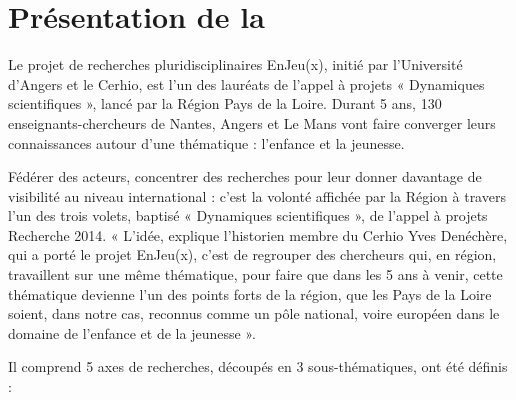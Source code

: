 \section{Présentation de la \pe\ }

Le projet de recherches pluridisciplinaires EnJeu(x), initié par l'Université d'Angers et le Cerhio, est l'un des lauréats de l'appel à projets « Dynamiques scientifiques », lancé par la Région Pays de la Loire. Durant 5 ans, 130 enseignants-chercheurs de Nantes, Angers et Le Mans vont faire converger leurs connaissances autour d'une thématique : l'enfance et la jeunesse.

Fédérer des acteurs, concentrer des recherches pour leur donner davantage de visibilité au niveau international : c'est la volonté affichée par la Région à travers l'un des trois volets, baptisé « Dynamiques scientifiques », de l'appel à projets Recherche 2014. « L'idée, explique l'historien membre du Cerhio Yves Denéchère, qui a porté le projet EnJeu(x), c'est de regrouper des chercheurs qui, en région, travaillent sur une même thématique, pour faire que dans les 5 ans à venir, cette thématique devienne l'un des points forts de la région, que les Pays de la Loire soient, dans notre cas, reconnus comme un pôle national, voire européen dans le domaine de l'enfance et de la jeunesse ».

Il comprend 5 axes de recherches, découpés en 3 sous-thématiques, ont été définis :

